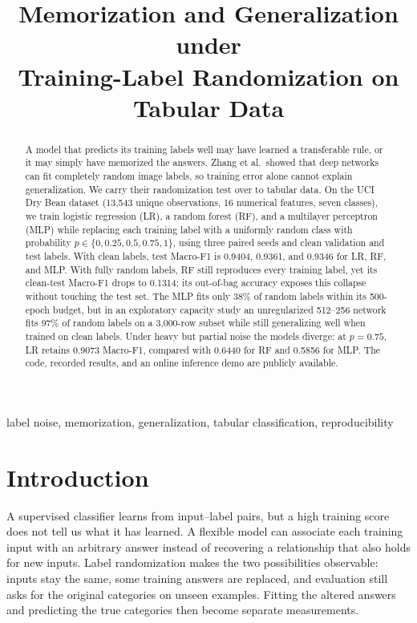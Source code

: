\documentclass[conference,letterpaper]{IEEEtran}
\begin{document}
\title{Memorization and Generalization under\\
Training-Label Randomization on Tabular Data}
\author{
}
\maketitle

\begin{abstract}
A model that predicts its training labels well may have learned a transferable rule, or it may simply have memorized the answers. Zhang et al.\ showed that deep networks can fit completely random image labels, so training error alone cannot explain generalization. We carry their randomization test over to tabular data. On the UCI Dry Bean dataset (13,543 unique observations, 16 numerical features, seven classes), we train logistic regression (LR), a random forest (RF), and a multilayer perceptron (MLP) while replacing each training label with a uniformly random class with probability $p\in\{0,0.25,0.5,0.75,1\}$, using three paired seeds and clean validation and test labels. With clean labels, test Macro-F1 is 0.9404, 0.9361, and 0.9346 for LR, RF, and MLP. With fully random labels, RF still reproduces every training label, yet its clean-test Macro-F1 drops to 0.1314; its out-of-bag accuracy exposes this collapse without touching the test set. The MLP fits only 38\% of random labels within its 500-epoch budget, but in an exploratory capacity study an unregularized 512--256 network fits 97\% of random labels on a 3,000-row subset while still generalizing well when trained on clean labels. Under heavy but partial noise the models diverge: at $p=0.75$, LR retains 0.9073 Macro-F1, compared with 0.6440 for RF and 0.5856 for MLP. The code, recorded results, and an online inference demo are publicly available.
\end{abstract}
\begin{IEEEkeywords}
label noise, memorization, generalization, tabular classification, reproducibility
\end{IEEEkeywords}

\section{Introduction}
\label{sec:introduction}
A supervised classifier learns from input--label pairs, but a high training score does not tell us what it has learned. A flexible model can associate each training input with an arbitrary answer instead of recovering a relationship that also holds for new inputs. Label randomization makes the two possibilities observable: inputs stay the same, some training answers are replaced, and evaluation still asks for the original categories on unseen examples. Fitting the altered answers and predicting the true categories then become separate measurements.
\end{document}
